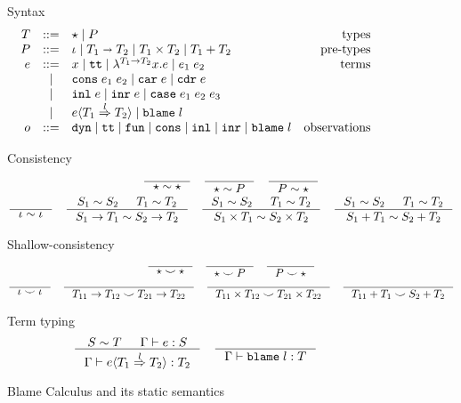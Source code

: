 \documentclass[acmsmall,review,anonymous]{acmart}\settopmatter{printfolios=true,printccs=false,printacmref=false}
\newcommand{\stxrule}[3]{#1 & ::= & #3 & \text{#2}\\}
\newcommand{\stxrulecont}[1]{& | & #1 & \\}
\newcommand{\plus}[0]{+}
\newcommand{\judgetype}[3]{#1 \vdash #2 : #3}
\newcommand{\POOunit}[0]{\iota}
\newcommand{\POOfun}[2]{#1 \shortrightarrow #2}
\newcommand{\POOprod}[2]{#1 \times #2}
\newcommand{\POOsum}[2]{#1 \plus #2}
\newcommand{\eOOvar}[1]{#1}
\newcommand{\eOOsole}[0]{\mathtt{tt}}
\newcommand{\eOOlam}[4]{\lambda^{#1\rightarrow{}#2}#3.#4}
\newcommand{\eOOapp}[2]{#1 \; #2}
\newcommand{\eOOcons}[2]{\mathtt{cons} \; #1 \; #2}
\newcommand{\eOOcar}[1]{\mathtt{car} \; #1}
\newcommand{\eOOcdr}[1]{\mathtt{cdr} \; #1}
\newcommand{\eOOinl}[1]{\mathtt{inl} \; #1}
\newcommand{\eOOinr}[1]{\mathtt{inr} \; #1}
\newcommand{\eOOcase}[3]{\mathtt{case} \; #1 \; #2 \; #3}
\newcommand{\eOOcast}[4]{#1 \langle \cOOcast{#2}{#3}{#4} \rangle}
\newcommand{\eOOblame}[1]{\mathtt{blame} \; #1}
\newcommand{\oOOinj}{\mathtt{dyn}}
\newcommand{\oOOsole}{\mathtt{tt}}
\newcommand{\oOOfun}{\mathtt{fun}}
\newcommand{\oOOcons}{\mathtt{cons}}
\newcommand{\oOOinl}{\mathtt{inl}}
\newcommand{\oOOinr}{\mathtt{inr}}
\newcommand{\oOOblame}[1]{\mathtt{blame} \; #1}
\newcommand{\cOOcast}[3]{#1 \overset{#2}{\Rightarrow} #3}
\begin{document}
\begin{figure}
	Syntax
	\[
	\begin{array}{rclr}
	\stxrule{T}{types}{
		\star \mid{}
		P
	}
	\stxrule{P}{pre-types}{
		\POOunit \mid
		\POOfun{T_1}{T_2} \mid
		\POOprod{T_1}{T_2} \mid
		\POOsum{T_1}{T_2}
	}
	\stxrule{e}{terms}{
		\eOOvar{x} \mid{}
		\eOOsole{} \mid{}
		\eOOlam{T_1}{T_2}{x}{e} \mid
		\eOOapp{e_1}{e_2}
	}
	\stxrulecont{
		\eOOcons{e_1}{e_2} \mid
		\eOOcar{e} \mid
		\eOOcdr{e}
	}
	\stxrulecont{
		\eOOinl{e} \mid
		\eOOinr{e} \mid
		\eOOcase{e_1}{e_2}{e_3}
	}
	\stxrulecont{
		\eOOcast{e}{T_1}{l}{T_2} \mid
		\eOOblame{l}
	}
	\stxrule{o}{observations}{
		\oOOinj \mid
		\oOOsole \mid
		\oOOfun \mid
		\oOOcons \mid
		\oOOinl \mid
		\oOOinr \mid
		\oOOblame{l}
	}
	\end{array}
	\]
	
	Consistency
	\begin{gather*}
	\inference{}{
		\star \sim \star
	} \quad
	\inference{}{
		\star \sim P
	} \quad
	\inference{}{
		P \sim \star
	} \\
	\inference{}{
		\iota \sim \iota
	} \quad
	\inference{
		S_1 \sim S_2 &
		T_1 \sim T_2
	}{
		S_1 \rightarrow T_1 \sim S_2 \rightarrow T_2
	} \quad
	\inference{
		S_1 \sim S_2 &
		T_1 \sim T_2
	}{
		S_1 \times T_1 \sim S_2 \times T_2
	} \quad
	\inference{
		S_1 \sim S_2 &
		T_1 \sim T_2
	}{
		S_1 \plus T_1 \sim S_2 \plus T_2
	}
	\end{gather*}
	
	Shallow-consistency
	\begin{gather*}
	\inference{}{
		\star \smile \star
	} \quad
	\inference{}{
		\star \smile P
	} \quad
	\inference{}{
		P \smile \star
	} \\
	\inference{}{
		\iota \smile \iota
	} \quad
	\inference{}{
		T_{11} \rightarrow T_{12} \smile T_{21} \rightarrow T_{22}
	} \quad
	\inference{}{
		T_{11} \times T_{12} \smile T_{21} \times T_{22}
	} \quad
	\inference{}{
	T_{11} \plus T_1 \smile S_2 \plus T_2
	}
	\end{gather*}
	
	Term typing
	\begin{gather*}
		\inference{
			S \sim T & \Gamma \vdash e : S 
		}{
			\judgetype{\Gamma}{\eOOcast{e}{T_1}{l}{T_2}}{T_2}
		} \quad
		\inference{
		}{
			\judgetype{\Gamma}{\eOOblame{l}}{T}
		}
	\end{gather*}
	
	\caption{Blame Calculus and its static semantics}
	\label{fig:blame-static}
\end{figure}
\end{document}
